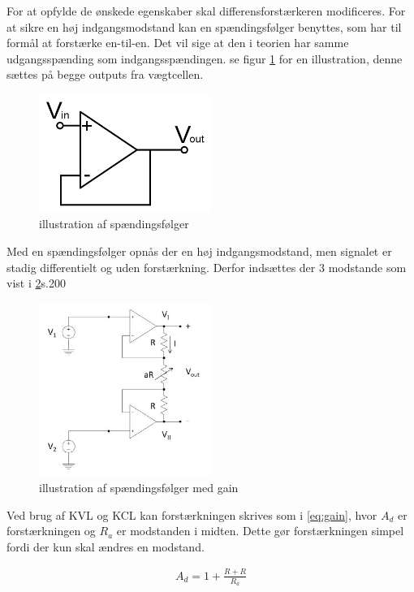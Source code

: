 For at opfylde de ønskede egenskaber skal differensforstærkeren modificeres. For at sikre en høj indgangsmodstand kan en spændingsfølger benyttes, som har til formål at forstærke en-til-en. Det vil sige at den i teorien har samme udgangsspænding som indgangsspændingen. se figur \ref{fig:bufferamp} for en illustration, denne sættes på begge outputs fra vægtcellen.
\begin{figure}[H]
	\centering
	\includegraphics[width=0.5\textwidth]{billeder/Hardware/bufferamp.png}
	\caption{illustration af spændingsfølger}
	\label{fig:bufferamp}
\end{figure}
Med en spændingsfølger opnås der en høj indgangsmodstand, men signalet er stadig differentielt og uden forstærkning. Derfor indsættes der 3 modstande som vist i \ref{fig:bufferampmedgain}\citep{ASBbog}s.200
\begin{figure}[H]
	\centering
	\includegraphics[width=0.5\textwidth]{billeder/Hardware/bufferampgain.JPG}
	\caption{illustration af spændingsfølger med gain}
	\label{fig:bufferampmedgain}
\end{figure}
Ved brug af KVL og KCL kan forstærkningen skrives som i \ref{eq:gain}, hvor $A_{d}$ er forstærkningen og $R_{a}$ er modstanden i midten. Dette gør forstærkningen simpel fordi der kun skal ændres en modstand. 

\begin{align}
 A_{d}=1+\frac{R+R}{R_{a}}
 \label{eq:gain}
 \end{align}
 
